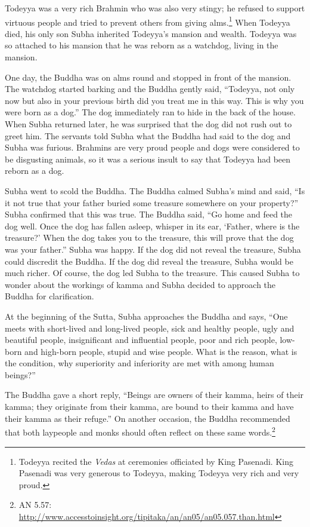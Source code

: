 Todeyya was a very rich Brahmin who was also very stingy; he refused to support virtuous people and tried to prevent others from giving alms.\footnote{Todeyya recited the \textit{Vedas} at ceremonies officiated by King Pasenadi. King Pasenadi was very generous to Todeyya, making Todeyya very rich and very proud.} When Todeyya died, his only son Subha inherited Todeyya’s mansion and wealth. Todeyya was so attached to his mansion that he was reborn as a watchdog, living in the mansion.

One day, the Buddha was on alms round and stopped in front of the mansion. The watchdog started barking and the Buddha gently said, “Todeyya, not only now but also in your previous birth did you treat me in this way. This is why you were born as a dog.” The dog immediately ran to hide in the back of the house. When Subha returned later, he was surprised that the dog did not rush out to greet him. The servants told Subha what the Buddha had said to the dog and Subha was furious. Brahmins are very proud people and dogs were considered to be disgusting animals, so it was a serious insult to say that Todeyya had been reborn as a dog.

Subha went to scold the Buddha. The Buddha calmed Subha’s mind and said, “Is it not true that your father buried some treasure somewhere on your property?” Subha confirmed that this was true. The Buddha said, “Go home and feed the dog well. Once the dog has fallen asleep, whisper in its ear, ‘Father, where is the treasure?’ When the dog takes you to the treasure, this will prove that the dog was your father.” Subha was happy. If the dog did not reveal the treasure, Subha could discredit the Buddha. If the dog did reveal the treasure, Subha would be much richer. Of course, the dog led Subha to the treasure. This caused Subha to wonder about the workings of kamma and Subha decided to approach the Buddha for clarification.

At the beginning of the Sutta, Subha approaches the Buddha and says, “One meets with short-lived and long-lived people, sick and healthy people, ugly and beautiful people, insignificant and influential people, poor and rich people, low-born and high-born people, stupid and wise people. What is the reason, what is the condition, why superiority and inferiority are met with among human beings?”

The Buddha gave a short reply, “Beings are owners of their kamma, heirs of their kamma; they originate from their kamma, are bound to their kamma and have their kamma as their refuge.” On another occasion, the Buddha recommended that both laypeople and monks should often reflect on these same words.\footnote{AN 5.57: \url{http://www.accesstoinsight.org/tipitaka/an/an05/an05.057.than.html}}


